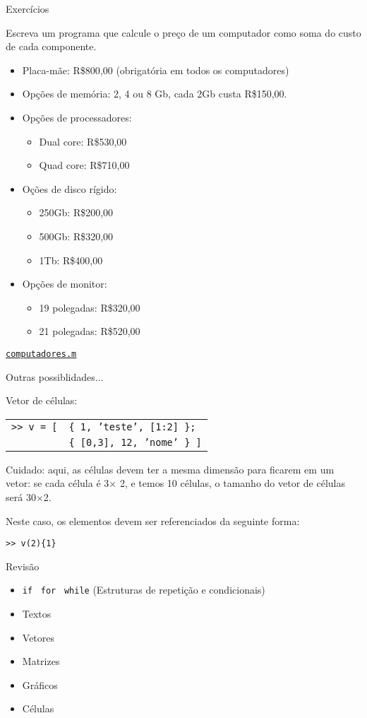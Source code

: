 \documentclass[hyperref={pdfpagelabels=false}]{beamer}
\begin{document}
\begin{frame}{Exercícios}
  
  Escreva um programa que calcule o preço de um computador como soma do custo de cada componente.

  \footnotesize{%
  \begin{itemize}
  \item Placa-mãe: R\$800,00 (obrigatória em todos os computadores)
  \item Opções de memória: 2, 4 ou 8 Gb, cada 2Gb custa R\$150,00.
  \item Opções de processadores:
    \begin{itemize}
    \item Dual core: R\$530,00
    \item Quad core: R\$710,00
    \end{itemize}
  \item Oções de disco rígido:
    \begin{itemize}
    \item 250Gb: R\$200,00
    \item 500Gb: R\$320,00
    \item 1Tb: R\$400,00
    \end{itemize}
  \item Opções de monitor:
    \begin{itemize}
    \item 19 polegadas: R\$320,00
    \item 21 polegadas: R\$520,00
    \end{itemize}
  \end{itemize}
}

\begin{center}
  \href{listings/computadores.m}{\underline{\texttt{computadores.m}}}
\end{center}
  
\end{frame}

\begin{frame}{Outras possiblidades...}

  Vetor de células:
  
  \begin{tabular}{rl}
    \texttt{>> v = [} & \texttt{\alert{\{} 1, 'teste', [1:2] \alert{\}};}\\
                      & \texttt{\alert{\{} [0,3], 12, 'nome' \alert{\}} ]}
  \end{tabular}
  \vfill

  Cuidado: aqui, as células devem ter a mesma dimensão para ficarem em um vetor: se cada célula é 3$\times $ 2, e temos 10 células, o tamanho do vetor de células será 30$\times$2.

  Neste caso, os elementos devem ser referenciados da seguinte forma:

  \texttt{>> v(2)\{1\}}
\end{frame}

\begin{frame}{Revisão}
  \begin{itemize}
  \item \texttt{if} \textemdash\ \texttt{for} \textemdash\ \texttt{while} (Estruturas de repetição e condicionais)
  \item Textos
  \item Vetores
  \item Matrizes
  \item Gráficos
  \item Células
  \end{itemize}
\end{frame}
\end{document}
